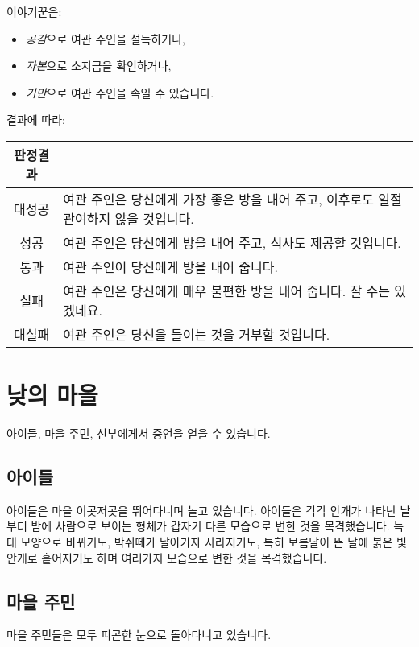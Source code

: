 \documentclass{report}
\begin{document}
	\begin{wosversion}
		이야기꾼은:
		
		\begin{itemize}
			\item \emph{공감}으로 여관 주인을 설득하거나,
			\item \emph{자본}으로 소지금을 확인하거나,
			\item \emph{기만}으로 여관 주인을 속일 수 있습니다.
		\end{itemize}
		\basesepline
		결과에 따라:
		
		\begin{tabularx}{\linewidth}{c!{\color{black}\vrule}X}
			판정결과 &  \\\hline\hline
			대성공 & 여관 주인은 당신에게 가장 좋은 방을 내어 주고, 이후로도 일절 관여하지 않을 것입니다.\\\hline
			성공 & 여관 주인은 당신에게 방을 내어 주고, 식사도 제공할 것입니다.\\\hline
			통과 & 여관 주인이 당신에게 방을 내어 줍니다.\\\hline
			실패 & 여관 주인은 당신에게 매우 불편한 방을 내어 줍니다. 잘 수는 있겠네요.\\\hline
			대실패 & 여관 주인은 당신을 들이는 것을 거부할 것입니다.\\\hline
		\end{tabularx}
	\end{wosversion}
	
	\section{낮의 마을}
	아이들, 마을 주민, 신부에게서 증언을 얻을 수 있습니다.
	
	\subsection{아이들}
	아이들은 마을 이곳저곳을 뛰어다니며 놀고 있습니다. 아이들은 각각 안개가 나타난 날 부터 밤에 사람으로 보이는 형체가 갑자기 다른 모습으로 변한 것을 목격했습니다. 늑대 모양으로 바뀌기도, 박쥐떼가 날아가자 사라지기도, 특히 보름달이 뜬 날에 붉은 빛 안개로 흩어지기도 하며 여러가지 모습으로 변한 것을 목격했습니다.
	
	\subsection{마을 주민}
	마을 주민들은 모두 피곤한 눈으로 돌아다니고 있습니다.
	
\end{document}
